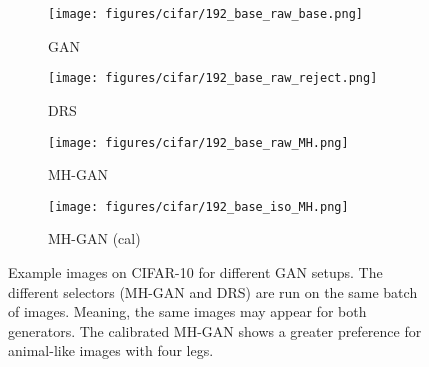 \begin{figure*}[htbp]
    \centering
    \begin{subfigure}[b]{0.49\textwidth}
       \centering
       \texttt{[image: figures/cifar/192\_base\_raw\_base.png]}
       \caption{GAN}
    \end{subfigure}
    \begin{subfigure}[b]{0.49\textwidth}
       \centering
       \texttt{[image: figures/cifar/192\_base\_raw\_reject.png]}
       \caption{DRS}
    \end{subfigure}
    \begin{subfigure}[b]{0.49\textwidth}
       \centering
       \texttt{[image: figures/cifar/192\_base\_raw\_MH.png]}
       \caption{MH-GAN}
    \end{subfigure}
    \begin{subfigure}[b]{0.49\textwidth}
       \centering
       \texttt{[image: figures/cifar/192\_base\_iso\_MH.png]}
       \caption{MH-GAN (cal)}
    \end{subfigure}
    \caption{{\small
    Example images on CIFAR-10 for different GAN setups.
    The different selectors (MH-GAN and DRS) are run on the same batch of images.
    Meaning, the same images may appear for both generators.
    The calibrated MH-GAN shows a greater preference for animal-like images with four legs.
    }}
    \label{fig:cifar_samples}
\end{figure*}
